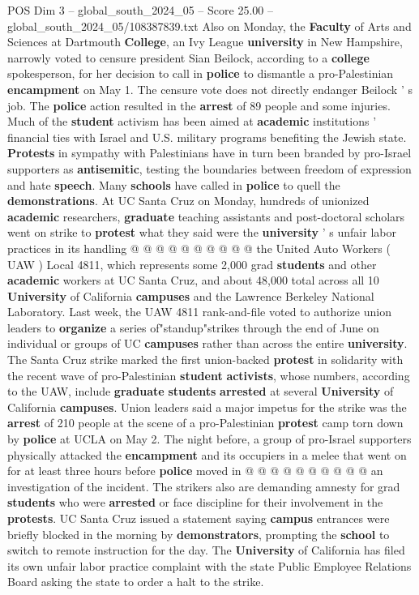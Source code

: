 \begin{textsample}{POS Dim 3 – global\_south\_2024\_05 – Score 25.00 – global\_south\_2024\_05/108387839.txt}
Also on Monday, the \textbf{Faculty} of Arts and Sciences at Dartmouth \textbf{College}, an Ivy League \textbf{university} in New Hampshire, narrowly voted to censure president Sian Beilock, according to a \textbf{college} spokesperson, for her decision to call in \textbf{police} to dismantle a pro-Palestinian \textbf{encampment} on May 1.
The censure vote does not directly endanger Beilock ' s job.
The \textbf{police} action resulted in the \textbf{arrest} of 89 people and some injuries.
Much of the \textbf{student} activism has been aimed at \textbf{academic} institutions ' financial ties with Israel and U.S. military programs benefiting the Jewish state. \textbf{Protests} in sympathy with Palestinians have in turn been branded by pro-Israel supporters as \textbf{antisemitic}, testing the boundaries between freedom of expression and hate \textbf{speech}.
Many \textbf{schools} have called in \textbf{police} to quell the \textbf{demonstrations}.
At UC Santa Cruz on Monday, hundreds of unionized \textbf{academic} researchers, \textbf{graduate} teaching assistants and post-doctoral scholars went on strike to \textbf{protest} what they said were the \textbf{university} ' s unfair labor practices in its handling @ @ @ @ @ @ @ @ @ @ the United Auto Workers ( UAW ) Local 4811, which represents some 2,000 grad \textbf{students} and other \textbf{academic} workers at UC Santa Cruz, and about 48,000 total across all 10 \textbf{University} of California \textbf{campuses} and the Lawrence Berkeley National Laboratory.
Last week, the UAW 4811 rank-and-file voted to authorize union leaders to \textbf{organize} a series of"standup"strikes through the end of June on individual or groups of UC \textbf{campuses} rather than across the entire \textbf{university}.
The Santa Cruz strike marked the first union-backed \textbf{protest} in solidarity with the recent wave of pro-Palestinian \textbf{student} \textbf{activists}, whose numbers, according to the UAW, include \textbf{graduate} \textbf{students} \textbf{arrested} at several \textbf{University} of California \textbf{campuses}.
Union leaders said a major impetus for the strike was the \textbf{arrest} of 210 people at the scene of a pro-Palestinian \textbf{protest} camp torn down by \textbf{police} at UCLA on May 2.
The night before, a group of pro-Israel supporters physically attacked the \textbf{encampment} and its occupiers in a melee that went on for at least three hours before \textbf{police} moved in @ @ @ @ @ @ @ @ @ @ an investigation of the incident.
The strikers also are demanding amnesty for grad \textbf{students} who were \textbf{arrested} or face discipline for their involvement in the \textbf{protests}.
UC Santa Cruz issued a statement saying \textbf{campus} entrances were briefly blocked in the morning by \textbf{demonstrators}, prompting the \textbf{school} to switch to remote instruction for the day.
The \textbf{University} of California has filed its own unfair labor practice complaint with the state Public Employee Relations Board asking the state to order a halt to the strike.


\end{textsample}
